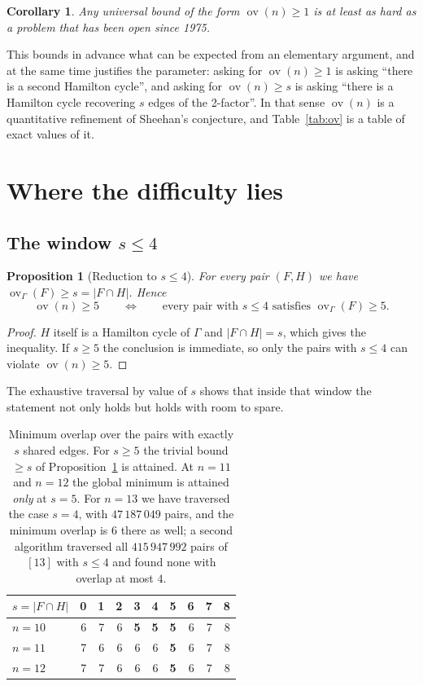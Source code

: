 \documentclass[11pt,a4paper]{article}
\newtheorem{proposition}[theorem]{Proposition}
\newtheorem{corollary}[theorem]{Corollary}
\theoremstyle{definition}
\theoremstyle{remark}
\newcommand{\ov}{\operatorname{ov}}
\begin{document}
\begin{corollary}\label{cor:wall}
Any universal bound of the form $\ov(n)\ge1$ is at least as hard as a problem that has been open since 1975.
\end{corollary}

This bounds in advance what can be expected from an elementary argument, and at the same time justifies the parameter: asking for $\ov(n)\ge1$ is asking ``there is a second Hamilton cycle'', and asking for $\ov(n)\ge s$ is asking ``there is a Hamilton cycle recovering $s$ edges of the 2-factor''. In that sense $\ov(n)$ is a quantitative refinement of Sheehan's conjecture, and Table~\ref{tab:ov} is a table of exact values of it.

\section{Where the difficulty lies}\label{sec:window}

\subsection{The window \texorpdfstring{$s\le4$}{s <= 4}}

\begin{proposition}[Reduction to $s\le4$]\label{prop:window}
For every pair $(F,H)$ we have $\ov_\Gamma(F)\ge s=|F\cap H|$. Hence
\[
\ov(n)\ge5
\qquad\Longleftrightarrow\qquad
\text{every pair with } s\le4 \text{ satisfies } \ov_\Gamma(F)\ge5 .
\]
\end{proposition}

\begin{proof}
$H$ itself is a Hamilton cycle of $\Gamma$ and $|F\cap H|=s$, which gives the inequality. If $s\ge5$ the conclusion is immediate, so only the pairs with $s\le4$ can violate $\ov(n)\ge5$.
\end{proof}

The exhaustive traversal by value of $s$ shows that inside that window the statement not only holds but holds with room to spare.

\begin{table}[h]
\centering
\begin{tabular}{lrrrrrrrrr}
\toprule
$s=|F\cap H|$ & 0 & 1 & 2 & 3 & 4 & 5 & 6 & 7 & 8\\
\midrule
$n=10$ & 6 & 7 & 6 & \textbf{5} & \textbf{5} & \textbf{5} & 6 & 7 & 8\\
$n=11$ & 7 & 6 & 6 & 6 & 6 & \textbf{5} & 6 & 7 & 8\\
$n=12$ & 7 & 7 & 6 & 6 & 6 & \textbf{5} & 6 & 7 & 8\\
\bottomrule
\end{tabular}
\caption{Minimum overlap over the pairs with exactly $s$ shared edges. For $s\ge5$ the trivial bound $\ge s$ of Proposition~\ref{prop:window} is attained. At $n=11$ and $n=12$ the global minimum is attained \emph{only} at $s=5$. For $n=13$ we have traversed the case $s=4$, with $47\,187\,049$ pairs, and the minimum overlap is $6$ there as well; a second algorithm traversed all $415\,947\,992$ pairs of $[13]$ with $s\le4$ and found none with overlap at most $4$.}\label{tab:pers}
\end{table}
\end{document}
